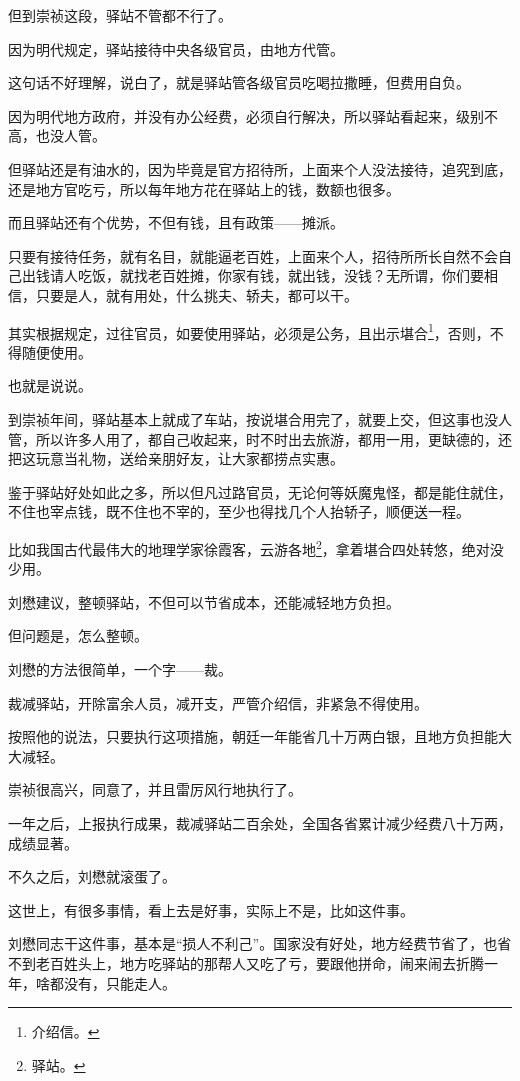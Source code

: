 \begin{multicols}{\theparacolNo}
		但到崇祯这段，驿站不管都不行了。

		因为明代规定，驿站接待中央各级官员，由地方代管。

		这句话不好理解，说白了，就是驿站管各级官员吃喝拉撒睡，但费用自负。

		因为明代地方政府，并没有办公经费，必须自行解决，所以驿站看起来，级别不高，也没人管。

		但驿站还是有油水的，因为毕竟是官方招待所，上面来个人没法接待，追究到底，还是地方官吃亏，所以每年地方花在驿站上的钱，数额也很多。

		而且驿站还有个优势，不但有钱，且有政策——摊派。

		只要有接待任务，就有名目，就能逼老百姓，上面来个人，招待所所长自然不会自己出钱请人吃饭，就找老百姓摊，你家有钱，就出钱，没钱？无所谓，你们要相信，只要是人，就有用处，什么挑夫、轿夫，都可以干。

		其实根据规定，过往官员，如要使用驿站，必须是公务，且出示堪合\footnote{介绍信。}，否则，不得随便使用。

		也就是说说。

		到崇祯年间，驿站基本上就成了车站，按说堪合用完了，就要上交，但这事也没人管，所以许多人用了，都自己收起来，时不时出去旅游，都用一用，更缺德的，还把这玩意当礼物，送给亲朋好友，让大家都捞点实惠。

		鉴于驿站好处如此之多，所以但凡过路官员，无论何等妖魔鬼怪，都是能住就住，不住也宰点钱，既不住也不宰的，至少也得找几个人抬轿子，顺便送一程。

		比如我国古代最伟大的地理学家徐霞客，云游各地\footnote{驿站。}，拿着堪合四处转悠，绝对没少用。

		刘懋建议，整顿驿站，不但可以节省成本，还能减轻地方负担。

		但问题是，怎么整顿。

		刘懋的方法很简单，一个字——裁。

		裁减驿站，开除富余人员，减开支，严管介绍信，非紧急不得使用。

		按照他的说法，只要执行这项措施，朝廷一年能省几十万两白银，且地方负担能大大减轻。

		崇祯很高兴，同意了，并且雷厉风行地执行了。

		一年之后，上报执行成果，裁减驿站二百余处，全国各省累计减少经费八十万两，成绩显著。

		不久之后，刘懋就滚蛋了。

		这世上，有很多事情，看上去是好事，实际上不是，比如这件事。

		刘懋同志干这件事，基本是“损人不利己”。国家没有好处，地方经费节省了，也省不到老百姓头上，地方吃驿站的那帮人又吃了亏，要跟他拼命，闹来闹去折腾一年，啥都没有，只能走人。


\end{multicols}
